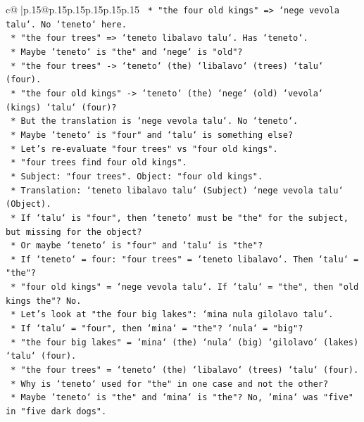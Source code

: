 \documentclass{article}
\begin{document}
{\begin{supertabular}{c@{$\;$}|p{.15\linewidth}@{}p{.15\linewidth}p{.15\linewidth}p{.15\linewidth}p{.15\linewidth}p{.15\linewidth}}
{{{\texttt{    *   "the four old kings" => `nege vevola talu`. No `teneto` here.} \\
\texttt{    *   "the four trees" => `teneto libalavo talu`. Has `teneto`.} \\
\texttt{    *   Maybe `teneto` is "the" and `nege` is "old"?} \\
\texttt{    *   "the four trees" {-}> `teneto` (the) `libalavo` (trees) `talu` (four).} \\
\texttt{    *   "the four old kings" {-}> `teneto` (the) `nege` (old) `vevola` (kings) `talu` (four)?} \\
\texttt{    *   But the translation is `nege vevola talu`. No `teneto`.} \\
\texttt{    *   Maybe `teneto` is "four" and `talu` is something else?} \\
\texttt{    *   Let's re{-}evaluate "four trees" vs "four old kings".} \\
\texttt{    *   "four trees find four old kings".} \\
\texttt{    *   Subject: "four trees". Object: "four old kings".} \\
\texttt{    *   Translation: `teneto libalavo talu` (Subject) `nege vevola talu` (Object).} \\
\texttt{    *   If `talu` is "four", then `teneto` must be "the" for the subject, but missing for the object?} \\
\texttt{    *   Or maybe `teneto` is "four" and `talu` is "the"?} \\
\texttt{    *   If `teneto` = four: "four trees" = `teneto libalavo`. Then `talu` = "the"?} \\
\texttt{    *   "four old kings" = `nege vevola talu`. If `talu` = "the", then "old kings the"? No.} \\
\texttt{    *   Let's look at "the four big lakes": `mina nula gilolavo talu`.} \\
\texttt{    *   If `talu` = "four", then `mina` = "the"? `nula` = "big"?} \\
\texttt{    *   "the four big lakes" = `mina` (the) `nula` (big) `gilolavo` (lakes) `talu` (four).} \\
\texttt{    *   "the four trees" = `teneto` (the) `libalavo` (trees) `talu` (four).} \\
\texttt{    *   Why is `teneto` used for "the" in one case and not the other?} \\
\texttt{    *   Maybe `teneto` is "the" and `mina` is "the"? No, `mina` was "five" in "five dark dogs".} \\
}}}
\end{supertabular}}
\end{document}
